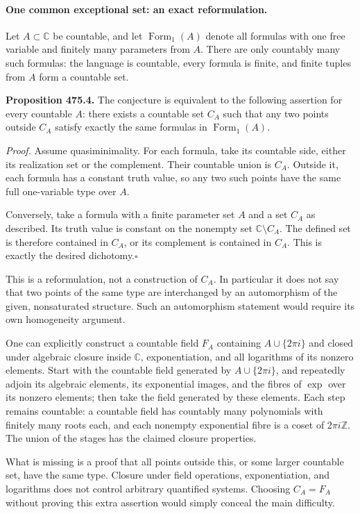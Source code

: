 \documentclass[11pt]{article}
\begin{document}
\paragraph{One common exceptional set: an exact reformulation.}
Let $A\subset\mathbb C$ be countable, and let $\operatorname{Form}_1(A)$
denote all formulas with one free variable and finitely many parameters
from $A$. There are only countably many such formulas: the language is
countable, every formula is finite, and finite tuples from $A$ form a
countable set.

\textbf{Proposition 475.4.} The conjecture is equivalent to the following
assertion for every countable $A$: there exists a countable set $C_A$
such that any two points outside $C_A$ satisfy exactly the same formulas
in $\operatorname{Form}_1(A)$.

\emph{Proof.}
Assume quasiminimality. For each formula, take its countable side, either
its realization set or the complement. Their countable union is $C_A$.
Outside it, each formula has a constant truth value, so any two such
points have the same full one-variable type over $A$.

Conversely, take a formula with a finite parameter set $A$ and a set
$C_A$ as described. Its truth value is constant on the nonempty set
$\mathbb C\setminus C_A$. The defined set is therefore contained in
$C_A$, or its complement is contained in $C_A$. This is exactly the
desired dichotomy.\hfill$\square$

This is a reformulation, not a construction of $C_A$. In particular it
does not say that two points of the same type are interchanged by an
automorphism of the given, nonsaturated structure. Such an automorphism
statement would require its own homogeneity argument.

One can explicitly construct a countable field $F_A$ containing
$A\cup\{2\pi i\}$ and closed under algebraic closure inside $\mathbb C$,
exponentiation, and all logarithms of its nonzero elements. Start with
the countable field generated by $A\cup\{2\pi i\}$, and repeatedly
adjoin its algebraic elements, its exponential images, and the fibres
of $\exp$ over its nonzero elements; then take the field generated by
these elements. Each step remains countable: a countable field has
countably many polynomials with finitely many roots each, and each
nonempty exponential fibre is a coset of $2\pi i\mathbb Z$.
The union of the stages has the claimed closure properties.

What is missing is a proof that all points outside this, or some larger
countable set, have the same type. Closure under field operations,
exponentiation, and logarithms does not control arbitrary quantified
systems. Choosing $C_A=F_A$ without proving this extra assertion would
simply conceal the main difficulty.
\end{document}
